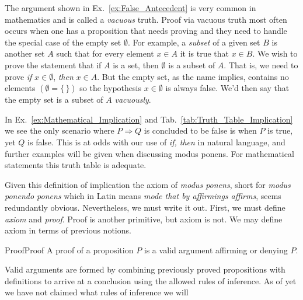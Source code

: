         \begin{example}
            \label{ex:Vacuous_Truth}%
            The argument shown in Ex.~\ref{ex:False_Antecedent} is very common
            in mathematics and is called a \textit{vacuous} truth.%
             Proof via vacuous truth
            most often occurs when one has a proposition that needs proving and
            they need to handle the special case of the empty set $\emptyset$.
            For example, a \textit{subset} of a given set $B$ is another set $A$
            such that for every element $x\in{A}$ it is true that $x\in{B}$. We
            wish to prove the statement that if $A$ is a set, then $\emptyset$
            is a subset of $A$. That is, we need to prove
            \textit{if} $x\in\emptyset$, \textit{then} $x\in{A}$. But the empty
            set, as the name implies, contains no elements $(\emptyset=\{\,\})$
            so the hypothesis $x\in\emptyset$ is always false. We'd then say
            that the empty set is a subset of $A$ \textit{vacuously}.
        \end{example}
        In Ex.~\ref{ex:Mathematical_Implication} and
        Tab.~\ref{tab:Truth_Table_Implication} we see the only scenario where
        $P\Rightarrow{Q}$ is concluded to be false is when $P$ is true, yet $Q$
        is false. This is at odds with our use of \textit{if, then} in natural
        language, and further examples will be given when discussing modus
        ponens. For mathematical statements this truth table is adequate.
        \par\hfill\par
        Given this definition of implication the axiom of \textit{modus ponens},
        short for \textit{modus ponendo ponens} which in Latin means
        \textit{mode that by affirmings affirms}, seems redundantly obvious.
        Nevertheless, we must write it out. First, we must define
        \textit{axiom} and \textit{proof}. Proof is another primitive, but axiom
        is not. We may define axiom in terms of previous notions.
        \begin{fdefinition}{Proof}{Proof}
            A \gls{proof} of a \gls{proposition} $P$ is a valid argument
            affirming or denying $P$.
        \end{fdefinition}
        Valid arguments are formed by combining previously proved propositions
        with definitions to arrive at a conclusion using the allowed rules of
        inference. As of yet we have not claimed what rules of inference we will
